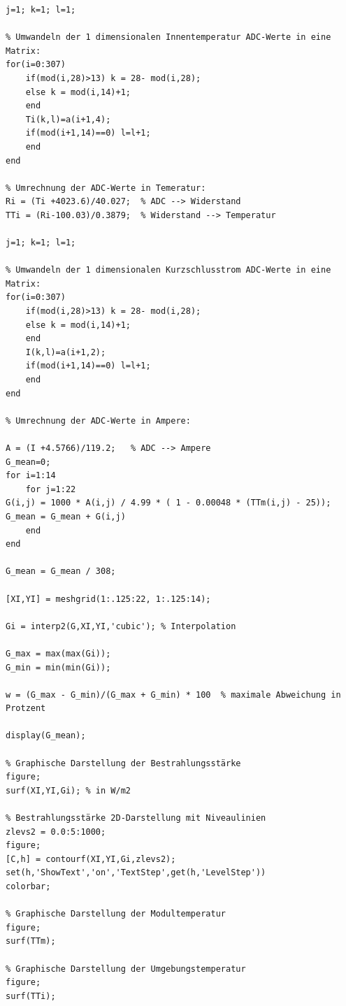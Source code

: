 \documentclass[a4paper,bibtotoc,oneside]{scrbook}
\begin{document}
\begin{appendix}
\begin{verbatim}
j=1; k=1; l=1;

% Umwandeln der 1 dimensionalen Innentemperatur ADC-Werte in eine Matrix:
for(i=0:307)
    if(mod(i,28)>13) k = 28- mod(i,28);
    else k = mod(i,14)+1;
    end
    Ti(k,l)=a(i+1,4);
    if(mod(i+1,14)==0) l=l+1;
    end
end

% Umrechnung der ADC-Werte in Temeratur:
Ri = (Ti +4023.6)/40.027;  % ADC --> Widerstand
TTi = (Ri-100.03)/0.3879;  % Widerstand --> Temperatur

j=1; k=1; l=1;

% Umwandeln der 1 dimensionalen Kurzschlusstrom ADC-Werte in eine Matrix:
for(i=0:307)
    if(mod(i,28)>13) k = 28- mod(i,28);
    else k = mod(i,14)+1;
    end
    I(k,l)=a(i+1,2);
    if(mod(i+1,14)==0) l=l+1;
    end
end

% Umrechnung der ADC-Werte in Ampere:

A = (I +4.5766)/119.2;   % ADC --> Ampere
G_mean=0;
for i=1:14
    for j=1:22
G(i,j) = 1000 * A(i,j) / 4.99 * ( 1 - 0.00048 * (TTm(i,j) - 25));
G_mean = G_mean + G(i,j)
    end
end

G_mean = G_mean / 308;

[XI,YI] = meshgrid(1:.125:22, 1:.125:14);

Gi = interp2(G,XI,YI,'cubic'); % Interpolation

G_max = max(max(Gi));
G_min = min(min(Gi));

w = (G_max - G_min)/(G_max + G_min) * 100  % maximale Abweichung in Protzent

display(G_mean);

% Graphische Darstellung der Bestrahlungsstärke
figure;
surf(XI,YI,Gi); % in W/m2

% Bestrahlungsstärke 2D-Darstellung mit Niveaulinien
zlevs2 = 0.0:5:1000;
figure;
[C,h] = contourf(XI,YI,Gi,zlevs2);
set(h,'ShowText','on','TextStep',get(h,'LevelStep'))
colorbar;

% Graphische Darstellung der Modultemperatur
figure;
surf(TTm); 

% Graphische Darstellung der Umgebungstemperatur
figure;
surf(TTi);  

\end{verbatim} 

\end{appendix}
\end{document}
